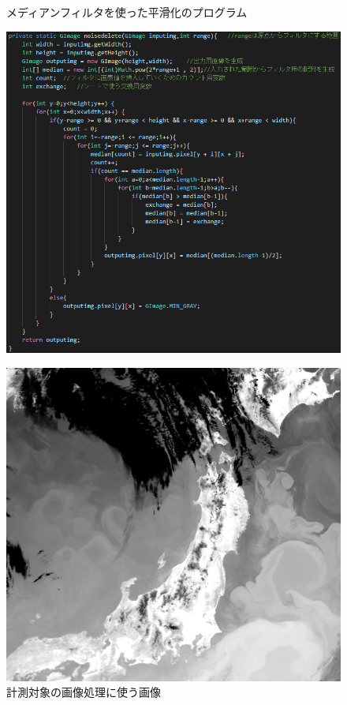 \begin{figure}[hbtp]
  \begin{minipage}[t]{0.7\hsize}   
    \centering
    \caption{メディアンフィルタを使った平滑化のプログラム}
    \label{graph:1}
    \includegraphics[scale = 0.6]{noisedeleteの中身1.PNG}
  \end{minipage}
  \begin{minipage}[t]{0.28\hsize}
    \centering
    \caption{計測対象の画像処理に使う画像}
    \label{graph:2}
    \includegraphics[scale = 0.3]{d850429avhrr4.bmp}
  \end{minipage}
\end{figure}

